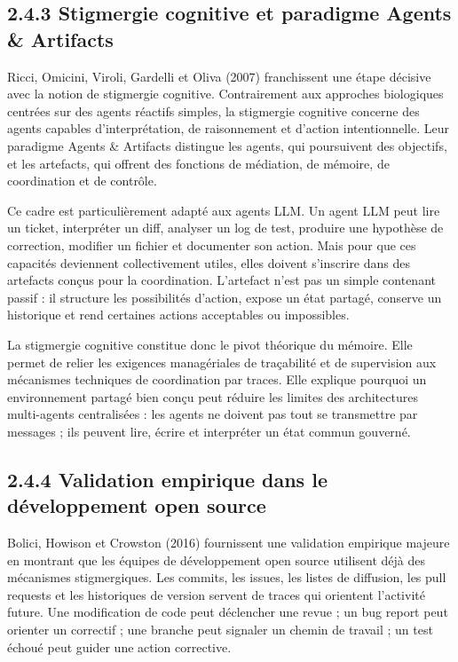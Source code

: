 \subsection{2.4.3 Stigmergie cognitive et paradigme Agents \& Artifacts}\label{stigmergie-cognitive-et-paradigme-agents-artifacts}

Ricci, Omicini, Viroli, Gardelli et Oliva (2007) franchissent une étape décisive avec la notion de stigmergie cognitive. Contrairement aux approches biologiques centrées sur des agents réactifs simples, la stigmergie cognitive concerne des agents capables d'interprétation, de raisonnement et d'action intentionnelle. Leur paradigme Agents \& Artifacts distingue les agents, qui poursuivent des objectifs, et les artefacts, qui offrent des fonctions de médiation, de mémoire, de coordination et de contrôle.

Ce cadre est particulièrement adapté aux agents LLM. Un agent LLM peut lire un ticket, interpréter un diff, analyser un log de test, produire une hypothèse de correction, modifier un fichier et documenter son action. Mais pour que ces capacités deviennent collectivement utiles, elles doivent s'inscrire dans des artefacts conçus pour la coordination. L'artefact n'est pas un simple contenant passif : il structure les possibilités d'action, expose un état partagé, conserve un historique et rend certaines actions acceptables ou impossibles.

La stigmergie cognitive constitue donc le pivot théorique du mémoire. Elle permet de relier les exigences managériales de traçabilité et de supervision aux mécanismes techniques de coordination par traces. Elle explique pourquoi un environnement partagé bien conçu peut réduire les limites des architectures multi-agents centralisées : les agents ne doivent pas tout se transmettre par messages ; ils peuvent lire, écrire et interpréter un état commun gouverné.

\subsection{2.4.4 Validation empirique dans le développement open source}\label{validation-empirique-dans-le-duxe9veloppement-open-source}

Bolici, Howison et Crowston (2016) fournissent une validation empirique majeure en montrant que les équipes de développement open source utilisent déjà des mécanismes stigmergiques. Les commits, les issues, les listes de diffusion, les pull requests et les historiques de version servent de traces qui orientent l'activité future. Une modification de code peut déclencher une revue ; un bug report peut orienter un correctif ; une branche peut signaler un chemin de travail ; un test échoué peut guider une action corrective.

